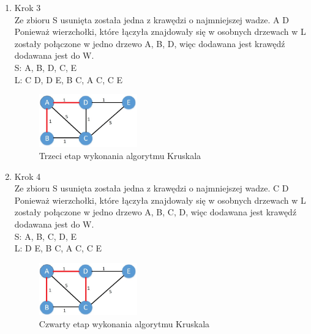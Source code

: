 \begin{enumerate}
\item Krok 3\\
Ze zbioru S usunięta została jedna z krawędzi o najmniejszej wadze. {A D} Ponieważ wierzchołki, które łączyła znajdowały się w osobnych drzewach w L zostały połączone w jedno drzewo {A, B, D}, więc dodawana jest krawędź dodawana jest do W.\\
S: {A, B, D}, {C}, {E}
\\
L: {C D}, {D E}, {B C}, {A C}, {C E}
\\
	\begin{figure}[htb!]
	\centering
	\includegraphics[width=0.4\textwidth]{tex/fig/Picture4}
	\caption{Trzeci etap wykonania algorytmu Kruskala}
	\label{fig: legendK3}
\end{figure}
\newpage
\item Krok 4\\
Ze zbioru S usunięta została jedna z krawędzi o najmniejszej wadze. {C D} Ponieważ wierzchołki, które łączyła znajdowały się w osobnych drzewach w L zostały połączone w jedno drzewo {A, B, C, D}, więc dodawana jest krawędź dodawana jest do W.\\
S: {A, B, C, D}, {E}
\\
L: {D E}, {B C}, {A C}, {C E}
\\

\begin{figure}[htb!]
	\centering
	\includegraphics[width=0.4\textwidth]{tex/fig/Picture5}
	\caption{Czwarty etap wykonania algorytmu Kruskala}
	\label{fig: legendK4}
\end{figure}


\end{enumerate}
